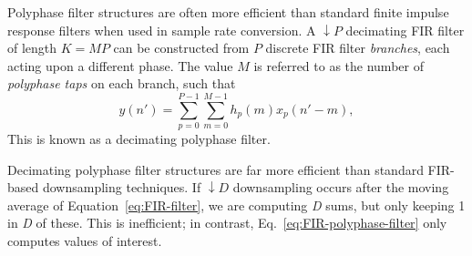 \documentclass{ws-rv961x669}
\begin{document}

Polyphase filter structures are often more efficient than standard finite impulse response filters when used in sample rate conversion. A $\downarrow P$ decimating FIR filter of length $K=MP$ can be constructed from $P$ discrete FIR filter \emph{branches}, each acting upon a different phase. The value $M$ is referred to as the number of \emph{polyphase taps} on each branch, such that
\begin{equation}
y(n')=\sum_{p=0}^{P-1}\sum_{m=0}^{M-1}h_{p}(m)x_{p}(n'-m),\label{eq:FIR-polyphase-filter}
\end{equation}
This is known as a decimating polyphase filter.


Decimating polyphase filter structures are far more efficient than standard FIR-based downsampling techniques. If $\downarrow D$ downsampling occurs after the moving average of Equation~\ref{eq:FIR-filter}, we are computing \emph{D} sums, but only keeping 1 in \emph{D} of these. This is inefficient; in contrast, Eq.~\ref{eq:FIR-polyphase-filter} only computes values of interest. 
\end{document}
